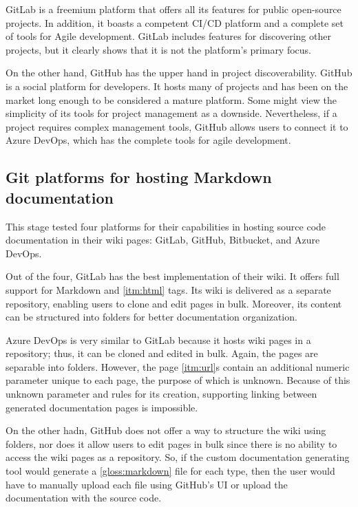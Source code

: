 GitLab is a freemium platform that offers all its features for public open-source projects. In addition, it boasts a competent CI/CD platform and a complete set of tools for Agile development. GitLab includes features for discovering other projects, but it clearly shows that it is not the platform's primary focus.

On the other hand, GitHub has the upper hand in project discoverability. GitHub is a social platform for developers. It hosts many of projects and has been on the market long enough to be considered a mature platform. Some might view the simplicity of its tools for project management as a downside. Nevertheless, if a project requires complex management tools, GitHub allows users to connect it to Azure DevOps, which has the complete tools for agile development.

\subsection{Git platforms for hosting Markdown documentation}

This stage tested four platforms for their capabilities in hosting source code documentation in their wiki pages: GitLab, GitHub, Bitbucket, and Azure DevOps.

Out of the four, GitLab has the best implementation of their wiki. It offers full support for Markdown and \ref{itm:html} tags.
Its wiki is delivered as a separate repository, enabling users to clone and edit pages in bulk. Moreover, its content can be structured into folders for better documentation organization.

Azure DevOps is very similar to GitLab because it hosts wiki pages in a repository; thus, it can be cloned and edited in bulk. Again, the pages are separable into folders. However, the page \ref{itm:url}s contain an additional numeric parameter unique to each page, the purpose of which is unknown. Because of this unknown parameter and rules for its creation, supporting linking between generated documentation pages is impossible.

On the other hadn, GitHub does not offer a way to structure the wiki using folders, nor does it allow users to edit pages in bulk since there is no ability to access the wiki pages as a repository. So, if the custom documentation generating tool would generate a \ref{gloss:markdown} file for each type, then the user would have to manually upload each file using GitHub's UI or upload the documentation with the source code.


